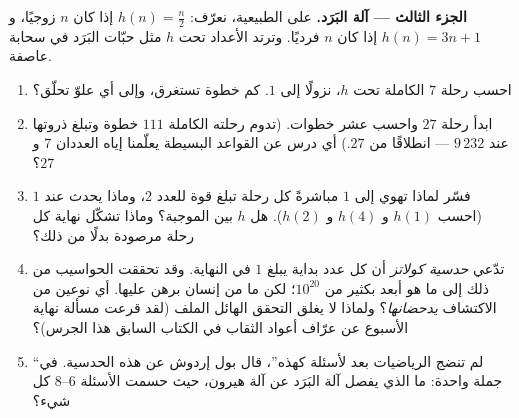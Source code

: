 \begin{problem}
\medskip
\noindent\textbf{الجزء الثالث --- آلة البَرَد.}
على  الطبيعية، نعرّف: $h(n) = \frac n2$ إذا كان $n$ زوجيًا،
و $h(n) = 3n + 1$ إذا كان $n$ فرديًا. وترتد الأعداد تحت $h$ مثل
حبّات البَرَد في سحابة عاصفة.
\begin{enumerate}[resume]
  \item احسب رحلة $7$ الكاملة تحت $h$، نزولًا إلى $1$.
        كم خطوة تستغرق، وإلى أي علوّ تحلّق؟
  \item ابدأ رحلة $27$ واحسب عشر خطوات. (تدوم
        رحلته الكاملة $111$ خطوة وتبلغ ذروتها عند $9\,232$ ---
        انطلاقًا من $27$.) أي درس عن القواعد
        البسيطة يعلّمنا إياه العددان $7$ و $27$؟
  \item فسّر لماذا تهوي إلى $1$ مباشرةً كل رحلة تبلغ قوة
        للعدد $2$، وماذا يحدث عند $1$
        (احسب $h(1)$ و $h(4)$ و $h(2)$). هل  $h$
         بين  الموجبة؟ وماذا
        تشكّل نهاية كل رحلة مرصودة بدلًا من ذلك؟
  \item تدّعي \emph{حدسية كولاتز} أن كل عدد
        بداية يبلغ $1$ في النهاية. وقد تحققت الحواسيب من ذلك
        إلى ما هو أبعد بكثير من $10^{20}$؛ لكن ما من إنسان برهن عليها. أي
        نوعين من الاكتشاف \emph{يدحضانها}؟ ولماذا
        لا يغلق التحقق الهائل الملف
        (لقد قرعت مسألة نهاية الأسبوع عن عرّاف أعواد الثقاب في الكتاب السابق هذا الجرس)؟
  \item ``لم تنضج الرياضيات بعد لأسئلة كهذه''، قال
        بول إردوش عن هذه الحدسية. في جملة واحدة: ما الذي
        يفصل آلة البَرَد عن آلة هيرون، حيث حسمت
        الأسئلة 6--8 كل شيء؟
\end{enumerate}


\end{problem}
